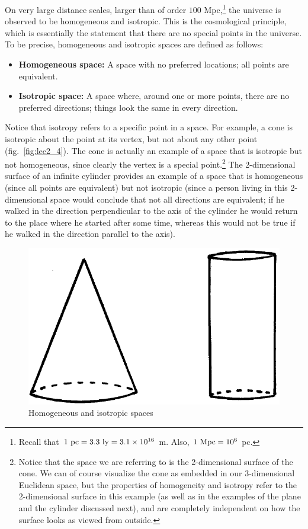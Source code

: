 On very large distance scales, larger than of order $100$ Mpc,\footnote{Recall that $1~{\rm pc}=3.3~{\rm ly}=3.1\times10^{16}$ m. Also, $1~{\rm Mpc}=10^6$ pc.} the universe is observed to be homogeneous and isotropic. This is the cosmological principle, which is essentially the statement that there are no special points in the universe. To be precise, homogeneous and isotropic spaces are defined as follows:
\begin{itemize}
\item {\bf Homogeneous space:} A space with no preferred locations; all points are equivalent.
\item {\bf Isotropic space:} A space where, around one or more points, there are no preferred directions; things look the same in every direction.
\end{itemize}
Notice that isotropy refers to a specific point in a space. For example, a cone is isotropic about the point at its vertex, but not about any other point (fig.\ \ref{fig:lec2_4}). The cone is actually an example of a space that is isotropic but not homogeneous, since clearly the vertex is a special point.\footnote{Notice that the space we are referring to is the 2-dimensional surface of the cone. We can of course visualize the cone as embedded in our 3-dimensional Euclidean space, but the properties of homogeneity and isotropy refer to the 2-dimensional surface in this example (as well as in the examples of the plane and the cylinder discussed next), and are completely independent on how the surface looks as viewed from outside.} The 2-dimensional surface of an infinite cylinder provides an example of a space that is homogeneous (since all points are equivalent) but not isotropic (since a person living in this 2-dimensional space would conclude that not all directions are equivalent; if he walked in the 
direction perpendicular to the axis of the cylinder he would return to the place where he started after some time, whereas this would not be true if he walked in the direction parallel to the axis).
\begin{figure}[ht]
\begin{center}
\includegraphics[scale=0.4]{Draw/lec4_4.png}
\end{center}
\caption{Homogeneous and isotropic spaces}
\label{fig:lec4_4}
\end{figure}

